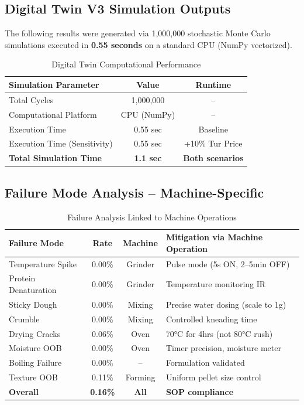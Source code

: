 \documentclass[12pt,a4paper]{article}
\begin{document}
\subsection{Digital Twin V3 Simulation Outputs}

The following results were generated via 1,000,000 stochastic Monte Carlo simulations executed in \textbf{0.55 seconds} on a standard CPU (NumPy vectorized).

\begin{table}[h]
\centering
\begin{tabular}{lcc}
\toprule
\textbf{Simulation Parameter} & \textbf{Value} & \textbf{Runtime} \\
\midrule
Total Cycles & 1,000,000 & -- \\
Computational Platform & CPU (NumPy) & -- \\
Execution Time & 0.55 sec & Baseline \\
Execution Time (Sensitivity) & 0.55 sec & +10\% Tur Price \\
\textbf{Total Simulation Time} & \textbf{1.1 sec} & \textbf{Both scenarios} \\
\bottomrule
\end{tabular}
\caption{Digital Twin Computational Performance}
\end{table}

\subsection{Failure Mode Analysis -- Machine-Specific}

\begin{table}[h]
\centering
\small
\begin{tabular}{lccp{6cm}}
\toprule
\textbf{Failure Mode} & \textbf{Rate} & \textbf{Machine} & \textbf{Mitigation via Machine Operation} \\
\midrule
Temperature Spike & 0.00\% & Grinder & Pulse mode (5s ON, 2--5min OFF) \\
Protein Denaturation & 0.00\% & Grinder & Temperature monitoring IR \\
Sticky Dough & 0.00\% & Mixing & Precise water dosing (scale to 1g) \\
Crumble & 0.00\% & Mixing & Controlled kneading time \\
Drying Cracks & 0.06\% & Oven & 70°C for 4hrs (not 80°C rush) \\
Moisture OOB & 0.00\% & Oven & Timer precision, moisture meter \\
Boiling Failure & 0.00\% & -- & Formulation validated \\
Texture OOB & 0.11\% & Forming & Uniform pellet size control \\
\midrule
\textbf{Overall} & \textbf{0.16\%} & \textbf{All} & \textbf{SOP compliance} \\
\bottomrule
\end{tabular}
\caption{Failure Analysis Linked to Machine Operations}
\end{table}
\end{document}
